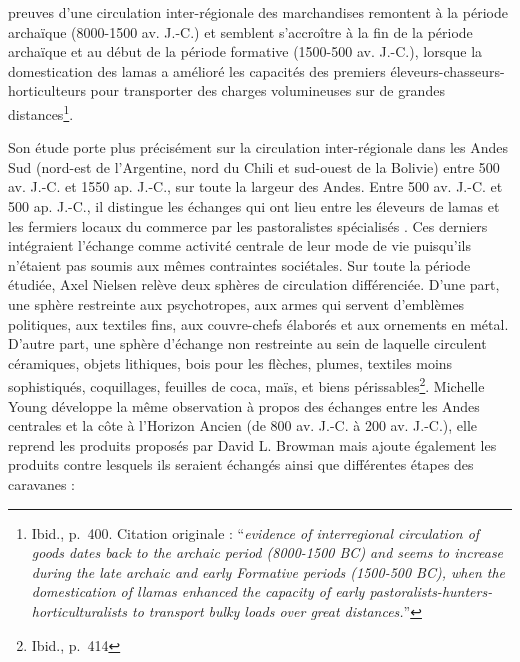 \begin{citer}
	[Les] preuves d'une circulation inter-régionale des marchandises remontent à la période archaïque (8000-1500 av. J.-C.) et semblent s'accroître à la fin de la période archaïque et au début de la période formative (1500-500 av. J.-C.), lorsque la domestication des lamas a amélioré les capacités des premiers éleveurs-chasseurs-horticulteurs pour transporter des charges volumineuses sur de grandes distances\footnote{Ibid., p.~400. Citation originale : \textquotedblleft \textit{evidence of interregional circulation of goods dates back to the archaic period (8000-1500 BC) and seems to increase during the late archaic and early Formative periods (1500-500 BC), when the domestication of llamas enhanced the capacity of early pastoralists-hunters-horticulturalists to transport bulky loads over great distances.}\textquotedblright}.
	\end{citer}

\noindent Son étude porte plus précisément sur la circulation inter-régionale dans les Andes Sud (nord-est de l'Argentine, nord du Chili et sud-ouest de la Bolivie) entre 500  av. J.-C. et 1550 ap. J.-C., sur toute la largeur des Andes. Entre 500  av. J.-C. et 500 ap. J.-C., il distingue les échanges qui ont lieu entre les éleveurs de lamas et les fermiers locaux du commerce par les \og pastoralistes spécialisés \fg. Ces derniers intégraient l'échange comme activité centrale de leur mode de vie puisqu'ils n'étaient pas soumis aux mêmes contraintes sociétales. Sur toute la période étudiée, Axel Nielsen relève deux sphères de circulation différenciée. D'une part, une sphère restreinte aux psychotropes, aux armes qui servent d'emblèmes politiques, aux textiles fins, aux couvre-chefs élaborés et aux ornements en métal. D'autre part, une sphère d'échange non restreinte au sein de laquelle circulent céramiques, objets lithiques, bois pour les flèches, plumes, textiles moins sophistiqués, coquillages, feuilles de coca, maïs, et biens périssables\footnote{Ibid., p.~414}. Michelle Young développe la même observation à propos des échanges entre les Andes centrales et la côte à l'Horizon Ancien (de 800  av. J.-C. à 200  av. J.-C.), elle reprend les produits proposés par David L. Browman mais ajoute également les produits contre lesquels ils seraient échangés ainsi que différentes étapes des caravanes : 

